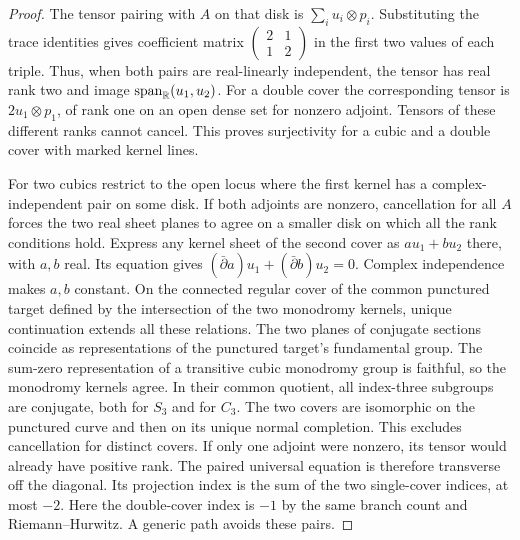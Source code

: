 \begin{proof}
The tensor pairing with $A$ on that disk is
$\sum_i u_i\otimes p_i$. Substituting the trace identities gives
coefficient matrix
$\left(\begin{smallmatrix}2&1\\1&2\end{smallmatrix}\right)$ in the
first two values of each triple. Thus, when both pairs are
real-linearly independent, the tensor has real rank two and image
$\operatorname{span}_{\mathbb R}(u_1,u_2)$. For a double cover the
corresponding tensor is $2u_1\otimes p_1$, of rank one on an open
dense set for nonzero adjoint. Tensors of these different ranks
cannot cancel. This proves surjectivity for a cubic and a double
cover with marked kernel lines.

For two cubics restrict to the open locus where the first kernel
has a complex-independent pair on some disk. If both adjoints
are nonzero, cancellation for all $A$ forces the two real sheet
planes to agree on a smaller disk on which all the rank conditions
hold. Express any kernel sheet of the second cover as $a u_1+b u_2$
there, with $a,b$ real. Its equation gives
$(\bar\partial a)u_1+(\bar\partial b)u_2=0$. Complex independence
makes $a,b$ constant. On the connected regular cover of the common
punctured target defined by the intersection of the two monodromy
kernels, unique continuation extends all these relations. The two
planes of conjugate sections coincide as representations of the
punctured target's fundamental group. The sum-zero representation
of a transitive cubic monodromy group is faithful, so the monodromy
kernels agree. In their common quotient, all index-three subgroups
are conjugate, both for $S_3$ and for $C_3$. The two covers are
isomorphic on the punctured curve and then on its unique normal
completion. This excludes cancellation for distinct covers. If
only one adjoint were nonzero, its tensor would already have
positive rank. The paired universal equation is therefore
transverse off the diagonal. Its projection index is the sum of the
two single-cover indices, at most $-2$. Here the double-cover index
is $-1$ by the same branch count and Riemann--Hurwitz. A generic
path avoids these pairs.


\end{proof}
